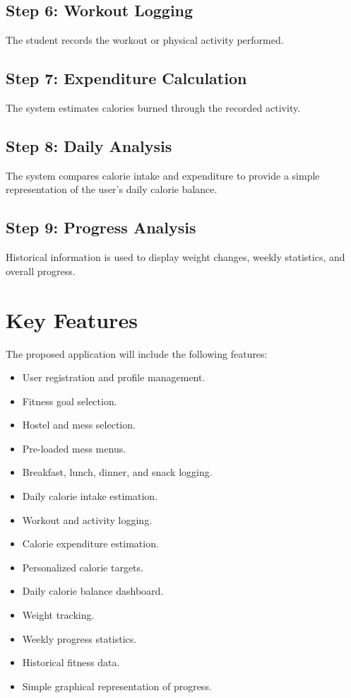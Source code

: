 \documentclass[11pt,a4paper]{article}
\begin{document}
\subsection*{Step 6: Workout Logging}
The student records the workout or physical activity performed.

\subsection*{Step 7: Expenditure Calculation}
The system estimates calories burned through the recorded activity.

\subsection*{Step 8: Daily Analysis}
The system compares calorie intake and expenditure to provide a simple representation of the user's daily calorie balance.

\subsection*{Step 9: Progress Analysis}
Historical information is used to display weight changes, weekly statistics, and overall progress.

\section{Key Features}

The proposed application will include the following features:
\begin{itemize}
    \item User registration and profile management.
    \item Fitness goal selection.
    \item Hostel and mess selection.
    \item Pre-loaded mess menus.
    \item Breakfast, lunch, dinner, and snack logging.
    \item Daily calorie intake estimation.
    \item Workout and activity logging.
    \item Calorie expenditure estimation.
    \item Personalized calorie targets.
    \item Daily calorie balance dashboard.
    \item Weight tracking.
    \item Weekly progress statistics.
    \item Historical fitness data.
    \item Simple graphical representation of progress.
\end{itemize}
\end{document}
